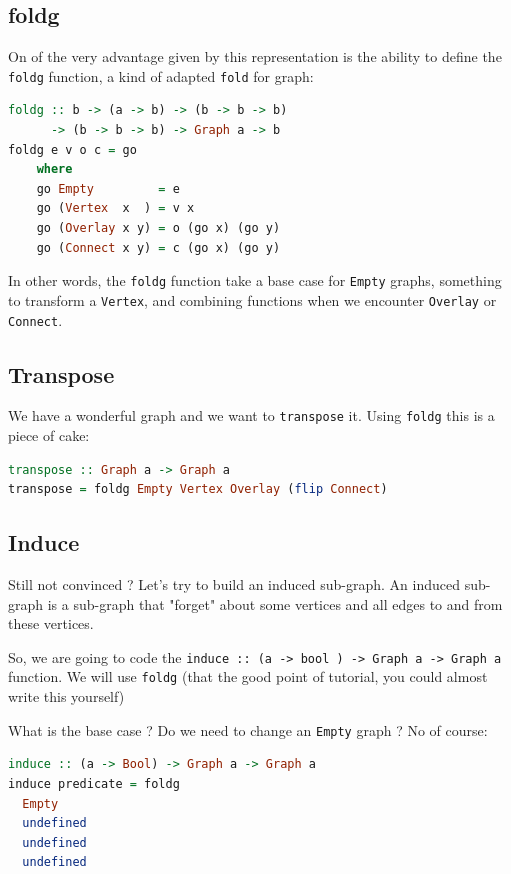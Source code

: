 \documentclass[10pt,a4paper]{article}
\begin{document}
\subsection{foldg}
On of the very advantage given by this representation is the ability to define the \verb|foldg| function, a kind of adapted \verb|fold| for graph:
\begin{lstlisting}[language=Haskell, frame=single]
foldg :: b -> (a -> b) -> (b -> b -> b)
      -> (b -> b -> b) -> Graph a -> b
foldg e v o c = go
	where
	go Empty         = e
	go (Vertex  x  ) = v x
	go (Overlay x y) = o (go x) (go y)
	go (Connect x y) = c (go x) (go y)
\end{lstlisting}
In other words, the \verb|foldg| function take a base case for \verb|Empty| graphs, something to transform a \verb|Vertex|, and combining functions when we encounter \verb|Overlay| or \verb|Connect|.

\subsection{Transpose}

We have a wonderful graph and we want to \verb|transpose| it. Using \verb|foldg| this is a piece of cake:

\begin{lstlisting}[language=Haskell, frame=single]
transpose :: Graph a -> Graph a
transpose = foldg Empty Vertex Overlay (flip Connect)
\end{lstlisting}

\subsection{Induce}

Still not convinced ? Let's try to build an induced sub-graph. An induced sub-graph is a sub-graph that "forget" about some vertices and all edges to and from these vertices.

So, we are going to code the \verb|induce :: (a -> bool ) -> Graph a -> Graph a| function. We will use \verb|foldg| (that the good point of tutorial, you could almost write this yourself)

What is the base case ? Do we need to change an \verb|Empty| graph ? No of course:

\begin{lstlisting}[language=Haskell, frame=single]
induce :: (a -> Bool) -> Graph a -> Graph a
induce predicate = foldg
  Empty 
  undefined
  undefined
  undefined
\end{lstlisting}
\end{document}
